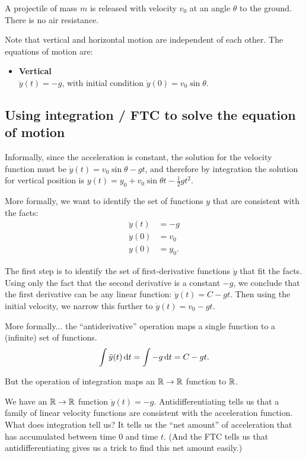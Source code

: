 A projectile of mass $m$ is released with velocity $v_0$ at an angle $\theta$ to the ground. There
is no air resistance.

Note that vertical and horizontal motion are independent of each other. The equations of motion are:

\begin{itemize}
\item {\bf Vertical}\\
  $\ddot{y}(t) = -g$, with initial condition $\dot{y}(0) = v_0\sin\theta$.
\end{itemize}

\subsection{Using integration / FTC to solve the equation of motion}
Informally, since the acceleration is constant, the solution for the velocity function must be
$\dot{y}(t) = v_0\sin\theta - gt$, and therefore by integration the solution for vertical
position is $y(t) = y_0 + v_0\sin\theta t -\frac{1}{2}gt^2$.

More formally, we want to identify the set of functions $y$ that are consistent with the facts:
\begin{align*}
  \ddot{y}(t) &= -g \\
  \dot{y}(0)  &= v_0 \\
  y(0)        &= y_0.
\end{align*}

The first step is to identify the set of first-derivative functions $\dot{y}$ that fit the
facts. Using only the fact that the second derivative is a constant $-g$, we conclude that the
first derivative can be any linear function: $\dot{y}(t) = C - gt$. Then using the initial
velocity, we narrow this further to $\dot{y}(t) = v_0 - gt$.

More formally... the ``antiderivative'' operation maps a single function to a (infinite) set of
functions.
\begin{align*}
  \int \ddot{y}(t) \dt = \int -g \dt = C - gt.
\end{align*}

But the operation of integration maps an $\mathbb{R} \to \mathbb{R}$ function to $\mathbb{R}$.

We have an $\mathbb{R} \to \mathbb{R}$ function $\ddot{y}(t) = -g$. Antidifferentiating tells us that a family of
linear velocity functions are consistent with the acceleration function. What does integration
tell us? It tells us the ``net amount'' of acceleration that has accumulated between time $0$ and
time $t$. (And the FTC tells us that antidifferentiating gives us a trick to find this net amount
easily.)

